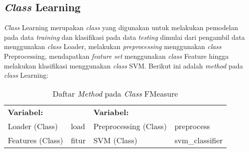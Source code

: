 \subsection{\textit{Class} Learning}
\textit{Class }Learning merupakan \textit{class }yang digunakan untuk melakukan pemodelan pada data \textit{training} dan klasifikasi pada data \textit{testing} dimulai dari pengambil data menggunakan \textit{class }Loader, melakukan \textit{preprocessing }menggunakan \textit{class }Preprocessing, mendapatkan \textit{feature set} menggunakan \textit{class }Feature hingga melakukan klasifikasi 
menggunakan \textit{class }SVM. Berikut ini adalah \textit{method} pada \textit{class }Learning:
\begin{table}[H]
	\caption{Daftar \textit{Method} pada \textit{Class} FMeasure}
	\centering
	\small
	\begin{adjustbox}{width=1\textwidth}	
	\begin{tabular}{|p{4cm} p{1cm} p{4cm} p{3.2cm}|}
		\hline
		\multicolumn{2}{|l}{\textbf{Variabel:}}&\multicolumn{2}{l|}{\textbf{Variabel:}}\\
		Loader (Class)&load&Preprocessing (Class)&preprocess\\
		Features (Class)&fitur&SVM (Class)&svm\_classifier \\
		\hline
	\end{tabular}
	\end{adjustbox}
\end{table}
